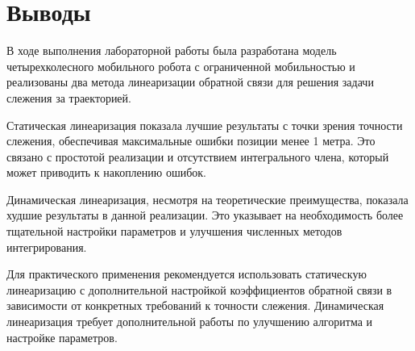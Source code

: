 \section{Выводы}

В ходе выполнения лабораторной работы была разработана модель четырехколесного мобильного робота с ограниченной мобильностью и реализованы два метода линеаризации обратной связи для решения задачи слежения за траекторией.

Статическая линеаризация показала лучшие результаты с точки зрения точности слежения, обеспечивая максимальные ошибки позиции менее 1 метра. Это связано с простотой реализации и отсутствием интегрального члена, который может приводить к накоплению ошибок.

Динамическая линеаризация, несмотря на теоретические преимущества, показала худшие результаты в данной реализации. Это указывает на необходимость более тщательной настройки параметров и улучшения численных методов интегрирования.

Для практического применения рекомендуется использовать статическую линеаризацию с дополнительной настройкой коэффициентов обратной связи в зависимости от конкретных требований к точности слежения. Динамическая линеаризация требует дополнительной работы по улучшению алгоритма и настройке параметров.

